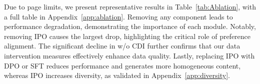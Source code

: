 


Due to page limits, we present representative results in Table~\ref{tab:Ablation}, with a full table in Appendix~\ref{app:ablation}. Removing any component leads to performance degradation, demonstrating the importance of each module. Notably, removing IPO causes the largest drop, highlighting the critical role of preference alignment. The significant decline in w/o CDI further confirms that our data intervention measures effectively enhance data quality. Lastly, replacing IPO with DPO or SFT reduces performance and generates more homogeneous content, whereas IPO increases diversity, as validated in Appendix~\ref{app:diversity}.

